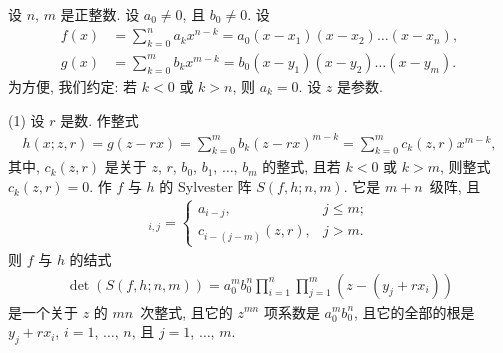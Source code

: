 \documentclass[../libro.tex]{subfiles}
\begin{document}
\begin{theorem}
    设 \(n\), \(m\) 是正整数.
    设 \(a_0 \neq 0\), 且 \(b_0 \neq 0\).
    设
    \begin{align*}
        f(x) &
        = \sum_{k = 0}^{n} {a_k x^{n-k}}
        = a_0 (x - x_1) (x - x_2) \dots (x - x_n),
        \\
        g(x) &
        = \sum_{k = 0}^{m} {b_k x^{m-k}}
        = b_0 (x - y_1) (x - y_2) \dots (x - y_m).
    \end{align*}
    为方便, 我们约定:
    若 \(k < 0\) 或 \(k > n\), 则 \(a_k = 0\).
    设 \(z\) 是参数.

    (1)
    设 \(r\) 是数.
    作整式
    \begin{align*}
        h(x; z, r)
        = g(z - r x)
        = \sum_{k = 0}^{m} {b_k (z - r x)^{m-k}}
        = \sum_{k = 0}^{m} {c_k (z, r) x^{m-k}},
    \end{align*}
    其中, \(c_k (z, r)\) 是关于
    \(z\), \(r\), \(b_0\), \(b_1\), \(\dots\), \(b_m\)
    的整式,
    且若 \(k < 0\) 或 \(k > m\),
    则整式 \(c_k (z, r) = 0\).
    作 \(f\) 与 \(h\) 的 Sylvester 阵 \(S(f, h; n, m)\).
    它是 \(m + n\)~级阵, 且
    \begin{align*}
        [S(f, h; n, m)]_{i,j} =
        \begin{cases}
            a_{i-j},            & j \leq m; \\
            c_{i-(j-m)} (z, r), & j > m.
        \end{cases}
    \end{align*}
    则 \(f\) 与 \(h\) 的结式
    \begin{align*}
        \det {(S(f, h; n, m))}
        = a_0^m b_0^n
        \prod_{i = 1}^{n} \prod_{j = 1}^{m}
        {(z - (y_j + r x_i))}
    \end{align*}
    是一个关于 \(z\) 的 \(m n\)~次整式,
    且它的 \(z^{m n}\) 项系数是 \(a_0^m b_0^n\),
    且它的全部的根是 \(y_j + r x_i\),
    \(i = 1\), \(\dots\), \(n\),
    且 \(j = 1\), \(\dots\), \(m\).


\end{theorem}
\end{document}
